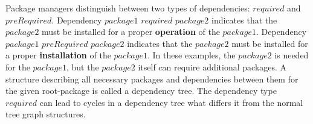 Package managers distinguish between two types of dependencies: $required$ and $preRequired$. %
Dependency $package1$ \textbf{$required$} $package2$ indicates that the $package2$ must be installed for a proper \textbf{operation} of the $package1$. %
Dependency $package1$ \textbf{$preRequired$} $package2$ indicates that the $package2$ must be installed for a proper \textbf{installation} of the $package1$. %
In these examples, the $package2$ is needed for the $package1$, but the $package2$ itself can require additional packages.
A structure describing all necessary packages and dependencies between them for the given root-package is called a dependency tree. 
The dependency type $required$ can lead to cycles in a dependency tree what differs it from the normal tree graph structures.

